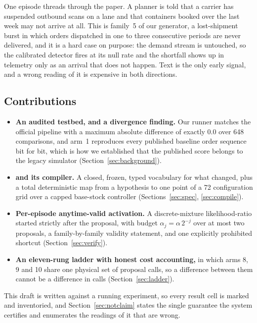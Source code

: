 

One episode threads through the paper. A planner is told that a carrier has
suspended outbound scans on a lane and that containers booked over the last week
may not arrive at all. This is family~5 of our generator, a lost-shipment burst in
which orders dispatched in one to three consecutive periods are never delivered,
and it is a hard case on purpose: the demand stream is untouched, so the
calibrated detector fires at its null rate and the shortfall shows up in
telemetry only as an arrival that does not happen. Text is the only early signal,
and a wrong reading of it is expensive in both directions.

\subsection*{Contributions}

\begin{itemize}\itemsep0pt
\item \textbf{An audited testbed, and a divergence finding.} Our runner matches
      the official pipeline with a maximum absolute difference of exactly $0.0$
      over 648 comparisons, and arm~1 reproduces every published baseline order
      sequence bit for bit, which is how we established that the published score
      belongs to the legacy simulator (Section~\ref{sec:background}).
\item \textbf{\shockspec{} and its compiler.} A closed, frozen, typed vocabulary
      for what changed, plus a total deterministic map from a hypothesis to one
      point of a 72 configuration grid over a capped base-stock controller
      (Sections~\ref{sec:spec}, \ref{sec:compile}).
\item \textbf{Per-episode anytime-valid activation.} A discrete-mixture
      likelihood-ratio \eprocess{} started strictly after the proposal, with
      budget $\alpha_j = \alpha\,2^{-j}$ over at most two proposals, a
      family-by-family validity statement, and one explicitly prohibited shortcut
      (Section~\ref{sec:verify}).
\item \textbf{An eleven-rung ladder with honest cost accounting,} in which arms
      8, 9 and 10 share one physical set of proposal calls, so a difference
      between them cannot be a difference in calls (Section~\ref{sec:ladder}).
\end{itemize}

This draft is written against a running experiment, so every result cell is
marked \pending{} and inventoried, and Section~\ref{sec:notclaim} states the
single guarantee the system certifies and enumerates the readings of it that are
wrong.
